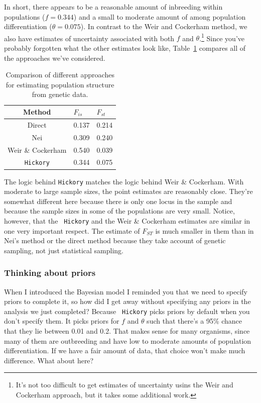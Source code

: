 In short, there appears to be a reasonable amount of inbreeding within
populations ($f = 0.344$) and a small to moderate amount of among
population differentiation ($\theta = 0.075$). In contrast to the Weir
and Cockerham method, we also have estimates of uncertainty associated
with both $f$ and $\theta$.\footnote{It's not too difficult to get
  estimates of uncertainty usins the Weir and Cockerham approach, but
  it takes some additional work.} Since you've probably forgotten what
the other estimates look like, Table~\ref{table:hickory-comparison}
compares all of the approaches we've considered.

\begin{table}
\begin{center}
  \begin{tabular}{c|ll}
\hline\hline
Method & $F_{is}$ & $F_{st}$ \\
\hline
Direct            & 0.137 & 0.214 \\
Nei               & 0.309 & 0.240 \\
Weir \& Cockerham & 0.540 & 0.039 \\
{\tt Hickory}     & 0.344 & 0.075 \\
\hline
\end{tabular}
\end{center}
\caption{Comparison of different approaches for estimating population
  structure from genetic data.}\label{table:hickory-comparison}
\end{table}

The logic behind {\tt Hickory\/} matches the logic behind Weir \&
Cockerham. With moderate to large sample sizes, the point estimates
are reasonably close. They're somewhat different here because there is
only one locus in the sample and because the sample sizes in some of
the populations are very small. Notice, however, that the {\tt
  Hickory} and the Weir \& Cockerham estimates are similar in one very
important respect. The estimate of $F_{ST}$ is much smaller in them
than in Nei's method or the direct method because they take account of
genetic sampling, not just statistical sampling.

\subsubsection*{Thinking about priors}

When I introduced the Bayesian model I reminded you that we need to
specify priors to complete it, so how did I get away without
specifying any priors in the analysis we just completed? Because {\tt
  Hickory} picks priors by default when you don't specify them. It
picks priors for $f$ and $\theta$ such that there's a 95\% chance that
they lie between 0.01 and 0.2. That makes sense for many organisms,
since many of them are outbreeding and have low to moderate amounts of
population differentiation. If we have a fair amount of data, that
choice won't make much difference. What about here?

